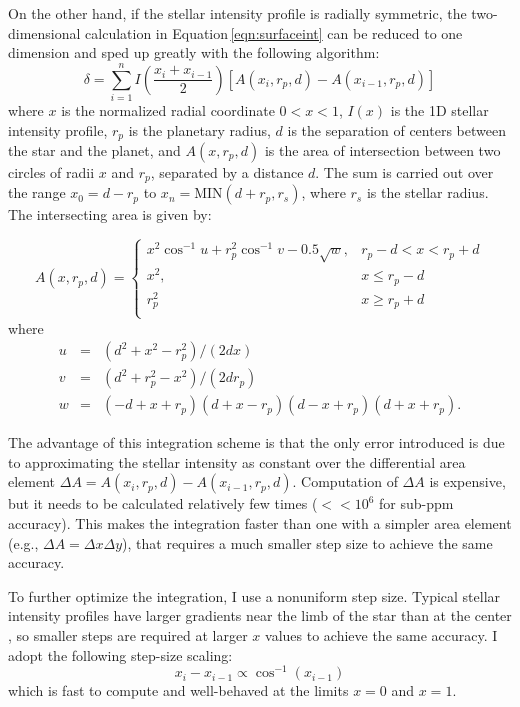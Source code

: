 \documentclass[12pt,preprint]{aastex}
\begin{document}
On the other hand, if the stellar intensity profile is radially symmetric, the two-dimensional calculation in Equation\,\ref{eqn:surfaceint} can be reduced to one dimension and sped up greatly with the following algorithm: 
\begin{equation}
\delta = \sum_{i=1}^{n} I\left(\frac{x_i+x_{i-1}}{2}\right) \left[A(x_{i}, r_p, d) - A(x_{i-1}, r_p, d)\right]
\end{equation}
where $x$ is the normalized radial coordinate $0 < x < 1$, $I(x)$ is the 1D stellar intensity profile, $r_p$ is the planetary radius, $d$ is the separation of centers between the star and the planet, and $A(x, r_p, d)$ is the area of intersection between two circles of radii $x$ and $r_p$, separated by a distance $d$.  The sum is carried out over the range $x_0 = d - r_p$ to $x_n = \textrm{MIN}(d + r_p, r_s)$, where $r_s$ is the stellar radius.  The intersecting area is given by:

\begin{equation}
A(x, r_p, d) = 
\begin{cases}
x^2\cos^{-1}{u} + r_p^2\cos^{-1}{v} - 0.5\sqrt{w}, & r_p -d < x < r_p + d\\
x^2, & x \le r_p - d\\
r_p^2 & x \ge r_p +d \\
\end{cases}
\end{equation}
where
\begin{eqnarray}
u &=& (d^2+x^2-r_p^2)/(2dx)\\
v &=& (d^2 + r_p^2 -x^2)/(2dr_p) \\
w &=& (-d+x+r_p)(d+x-r_p)(d-x+r_p)(d+x+r_p).
\end{eqnarray}

The advantage of this integration scheme is that the only error introduced is due to approximating the stellar intensity as constant over the differential area element $\Delta A = A(x_i, r_p, d) - A(x_{i-1}, r_p, d)$.  Computation of $\Delta A$ is expensive, but it needs to be calculated relatively few times ($<<10^{6}$ for sub-ppm accuracy). This makes the integration faster than one with a simpler area element (e.g., $\Delta A = \Delta x \Delta y$), that requires a much smaller step size to achieve the same accuracy.

To further optimize the integration, I use a nonuniform step size.  Typical stellar intensity profiles have larger gradients near the limb of the star than at the center \citep[e.g.][]{claret00}, so smaller steps are required at larger $x$ values to achieve the same accuracy.  I adopt the following step-size scaling: 
$$
x_i - x_{i-1} \propto \cos^{-1}\left(x_{i-1}\right)
$$  
which is fast to compute and well-behaved at the limits $x=0$ and $x=1$.
\end{document}

